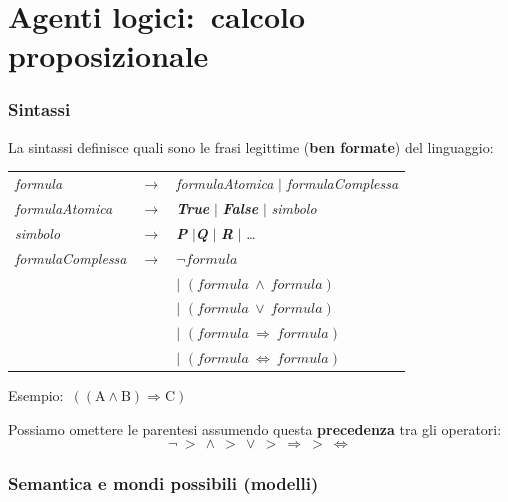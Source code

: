 \section{Agenti logici:\ calcolo proposizionale}

\subsubsection{Sintassi}

La sintassi definisce quali sono le frasi legittime (\textbf{ben formate}) del linguaggio:

\begin{table}[H]
	\centering
	\begin{tabular}{l l p{16em}}
		\textit{formula}          & $\rightarrow$ & \textit{formulaAtomica} $|$ \textit{formulaComplessa}                        \\
		\textit{formulaAtomica}   & $\rightarrow$ & \textbf{\textit{True}} $|$ \textbf{\textit{False} }$|$ \textit{simbolo}      \\
		\textit{simbolo}          & $\rightarrow$ & \textbf{\textit{P}} $|$\textbf{\textit{Q}} $|$ \textbf{\textit{R}} $|$ \dots \\
		\textit{formulaComplessa} & $\rightarrow$ & $\lnot formula$                                                              \\
		                          &               & $|$ $(formula\ \land\ formula)$                                              \\
		                          &               & $|$ $(formula\ \lor\ formula)$                                               \\
		                          &               & $|$ $(formula\ \Rightarrow\ formula)$                                        \\
		                          &               & $|$ $(formula\ \Leftrightarrow\ formula)$                                    \\
	\end{tabular}
\end{table}

\noindent Esempio:\ $((\mathrm{A} \land \mathrm{B}) \Rightarrow \mathrm{C})$

\noindent Possiamo omettere le parentesi assumendo questa \textbf{precedenza} tra gli operatori:
\[
	\lnot\ >\ \land\ >\ \lor\ >\ \Rightarrow\ >\ \Leftrightarrow
\]

\subsubsection{Semantica e mondi possibili (modelli)}


